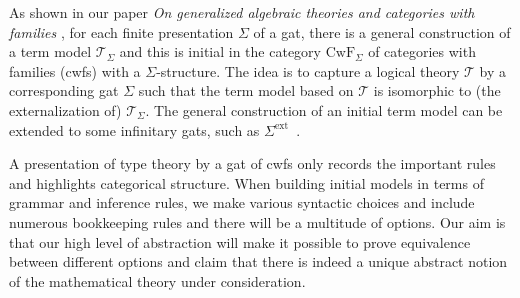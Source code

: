 \documentclass{easychair}
\newcommand{\T}{\mathsf{T}}
\def\T{\mathcal{T}}
\def\CwF{\mathrm{CwF}}
\def\Sigmaext{{\Sigma^\mathrm{ext}}}
\begin{document}
As shown in our paper {\em On generalized algebraic theories and categories with families} \cite{bezem:hofmann}, for each finite presentation $\Sigma$ of a gat, there is a general construction of a term model $\T_\Sigma$ and this is initial in the category $\CwF_\Sigma$ of categories with families (cwfs) with a $\Sigma$-structure. The idea is to capture a logical theory $\T$ by a corresponding gat $\Sigma$ such that the term model based on $\T$ is isomorphic to (the externalization of) $\T_\Sigma$. The general construction of an initial term model can be extended to some infinitary gats, such as  $\Sigmaext$~\cite[Section 5.7]{bezem:hofmann}.

A presentation of type theory by a gat of cwfs 
only records the important rules and highlights categorical structure. When building initial models in terms of grammar and inference rules, we make various syntactic choices and include numerous bookkeeping rules and there will be a multitude of options. Our aim is that our high level of abstraction will make it possible to prove equivalence between different options and claim that there is indeed a unique abstract notion of the mathematical theory under consideration.
\end{document}
